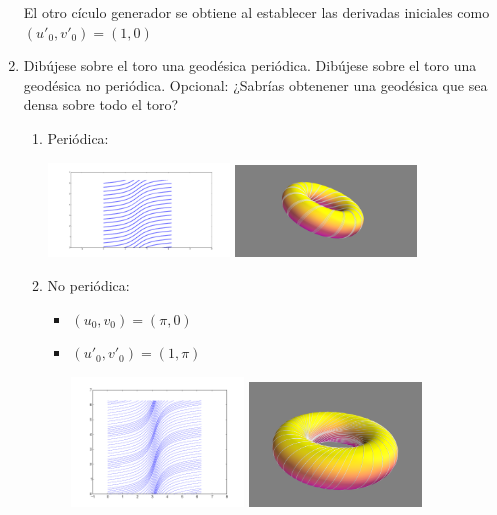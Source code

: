 \documentclass[12pt,a4paper]{article}
\begin{document}
\begin{enumerate}
  El otro cículo generador se obtiene al establecer las derivadas iniciales
  como\\ $(u'_0, v'_0) = (1, 0)$
\newpage{}
\item Dibújese sobre el toro una geodésica periódica. Dibújese sobre
  el toro una geodésica no periódica. Opcional: ¿Sabrías obtenener una
  geodésica que sea densa sobre todo el toro?
  \begin{enumerate}
  \item Periódica: 
    \begin{center}
      \includegraphics[width=0.4\textwidth]{./img/periodica_trace.png}
      \includegraphics[width=0.4\textwidth]{./img/periodica_surface.png}
    \end{center}
  \item No periódica:
    \begin{itemize}
    \item $(u_0, v_0) = (\pi, 0)$
    \item $(u'_0, v'_0) = (1, \pi) $
      \begin{center}
        \includegraphics[width=0.4\textwidth]{./img/noperiodico_trace.png}
        \includegraphics[width=0.4\textwidth]{./img/noperiodico_surface.png}
      \end{center}


\end{itemize}
\end{enumerate}
\end{enumerate}
\end{document}
